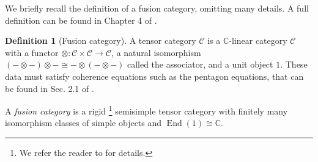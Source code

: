 \documentclass[aps,prb,twocolumn,superscriptaddress,noshowkeys]{revtex4-2}  %
\DeclareMathOperator{\End}{End}
\newcommand{\cat}{\mathcal{C}}
\theoremstyle{plain}%
\theoremstyle{definition}
\newtheorem{definition}{Definition}[section]
\theoremstyle{remark}
\begin{document}
We briefly recall the definition of a fusion category, omitting many details. A full definition can be found in Chapter 4 of \cite{Etingof2015}.
\begin{definition}[Fusion category]
	A tensor category $\cat$ is a $\mathbb{C}$-linear category $\cat$ with a functor $\otimes:\cat\times\cat\to\cat$, a natural isomorphism $(-\otimes-)\otimes-\cong-\otimes(-\otimes-)$ called the associator, and a unit object $1$.
	These data must satisfy coherence equations such as the pentagon equations, that can be found in Sec. 2.1 of \cite{Etingof2015}.
	
	A \emph{fusion category} is a rigid \footnote{We refer the reader to \cite{Etingof2015} for details.} semisimple tensor category with finitely many isomorphism classes of simple objects and $\End(1)\cong \mathbb{C}$.
	

\end{definition}
\end{document}
